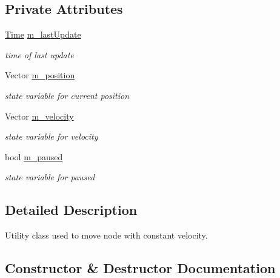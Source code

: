 \subsection*{Private Attributes}
\begin{DoxyCompactItemize}
\item 
\hyperlink{classns3_1_1Time}{Time} \hyperlink{classns3_1_1ConstantVelocityHelper_a0dde79b8e505b6cb2ae16e550d5cdfaf}{m\+\_\+last\+Update}
\begin{DoxyCompactList}\small\item\em time of last update \end{DoxyCompactList}\item 
Vector \hyperlink{classns3_1_1ConstantVelocityHelper_a2961dff788750be98c75f6e4ff7a46b0}{m\+\_\+position}
\begin{DoxyCompactList}\small\item\em state variable for current position \end{DoxyCompactList}\item 
Vector \hyperlink{classns3_1_1ConstantVelocityHelper_ae60e63f13f3f06441bd84bc639b89f6d}{m\+\_\+velocity}
\begin{DoxyCompactList}\small\item\em state variable for velocity \end{DoxyCompactList}\item 
bool \hyperlink{classns3_1_1ConstantVelocityHelper_aff695de58e267b167ef58e1ae9155720}{m\+\_\+paused}
\begin{DoxyCompactList}\small\item\em state variable for paused \end{DoxyCompactList}\end{DoxyCompactItemize}


\subsection{Detailed Description}
Utility class used to move node with constant velocity. 

\subsection{Constructor \& Destructor Documentation}
